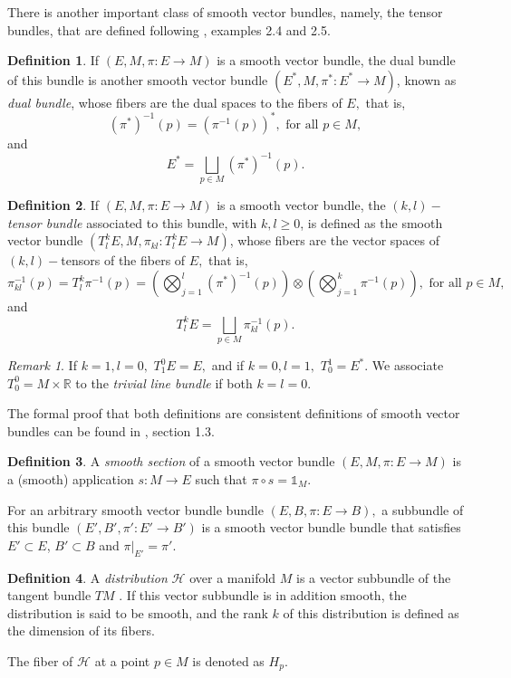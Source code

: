 \documentclass[12pt, letterpaper, reqno]{amsart}
\theoremstyle{definition}
\newtheorem{df}{Definition}
\theoremstyle{plain}
\theoremstyle{remark}
\newtheorem{rem}{Remark}
\begin{document}
There is another important class of smooth vector bundles, namely, the tensor bundles, that are defined following \cite{wendl2008lecture}, examples 2.4 and 2.5.
\begin{df} 
	If $ (E,M,\pi:E \rightarrow {M}) $ is a smooth vector bundle, the dual bundle of this bundle is another smooth vector bundle $ (E^*,M,\pi^*:E^*\rightarrow {M}) $, known as \textit{ dual bundle}, whose fibers are the dual spaces to the fibers of $ E, $ that is,
	$$ (\pi^{*})^{-1}(p)=(\pi^{-1}(p))^*, \text{ for all }p\in M,$$ 
	and $$ E^* =\bigsqcup_{p\in M} (\pi^*)^{-1}(p). $$ 
\end{df}
\begin{df}
	If $ (E,M,\pi:E \rightarrow {M}) $ is a smooth vector bundle, the \textit{$ (k,l)- $tensor bundle} associated to this bundle, with $ k,l\geq0 $, is defined as the smooth vector bundle $ (T^k_l E, M, \pi_{kl}: T^k_l E \rightarrow {M}) $, whose fibers are the vector spaces of $ (k,l) -$tensors of the fibers of $ E, $ that is,     
	$$ \pi_{kl}^{-1}(p) = T^k_l \pi^{-1}(p)=\left( \bigotimes_{j=1}^l (\pi^{*})^{-1}(p)\right)\otimes \left( \bigotimes_{j=1}^k \pi^{-1}(p) \right), \text{ for all }p\in M, $$ 
	and
	$$ T^k_l E = \bigsqcup_{p\in M} \pi_{kl}^{-1}(p). $$ 
\end{df}
\begin{rem}
	If $ k=1,l=0, $ $T^0_1E=E,$ and if $ k=0,l=1, $ $ T^1_0=E^*. $ We associate $ T^0_0=M\times \mathbb{R} $ to the \textit{trivial line bundle} if both $ k=l=0. $ 
\end{rem}

The formal proof that both definitions are consistent definitions of smooth vector bundles can be found in \cite{luke2013vector}, section 1.3.
\begin{df}
	A \textit{smooth section} of a smooth vector bundle $ (E,M,\pi:E \rightarrow {M}) $ is a (smooth) application $ s: M \rightarrow {E} $ such that $ \pi\circ s= \mathbb{1}_{M}. $    
\end{df}
For an arbitrary smooth vector bundle bundle $ (E,B,\pi:E \rightarrow {B}), $ a subbundle of this bundle $ (E',B',\pi':E' \rightarrow {B'}) $  is a smooth vector bundle bundle that satisfies $ E'\subset E $, $ B'\subset B $ and $ \pi|_{E'}=\pi'. $
\begin{df}
	
	A \textit{distribution} $ \mathcal{H} $ over a manifold $ M $  is a vector subbundle of the tangent bundle $ TM $ . If this vector subbundle is in addition smooth, the distribution is said to be smooth, and the rank $ k $  of this distribution is defined as the dimension of its fibers.

	The fiber of $ \mathcal{H} $ at a point $ p\in M $ is denoted as $ H_p. $ 
\end{df}
\end{document}
